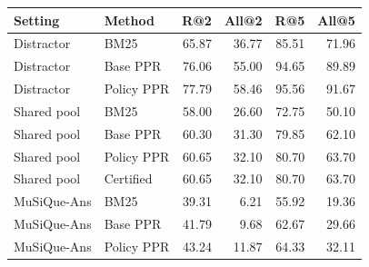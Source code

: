 \begin{tabular}{llrrrr}\toprule
Setting & Method & R@2 & All@2 & R@5 & All@5 \\
\midrule
Distractor & BM25 & 65.87 & 36.77 & 85.51 & 71.96 \\
Distractor & Base PPR & 76.06 & 55.00 & 94.65 & 89.89 \\
Distractor & Policy PPR & 77.79 & 58.46 & 95.56 & 91.67 \\
Shared pool & BM25 & 58.00 & 26.60 & 72.75 & 50.10 \\
Shared pool & Base PPR & 60.30 & 31.30 & 79.85 & 62.10 \\
Shared pool & Policy PPR & 60.65 & 32.10 & 80.70 & 63.70 \\
Shared pool & Certified & 60.65 & 32.10 & 80.70 & 63.70 \\
MuSiQue-Ans & BM25 & 39.31 & 6.21 & 55.92 & 19.36 \\
MuSiQue-Ans & Base PPR & 41.79 & 9.68 & 62.67 & 29.66 \\
MuSiQue-Ans & Policy PPR & 43.24 & 11.87 & 64.33 & 32.11 \\
\bottomrule\end{tabular}
